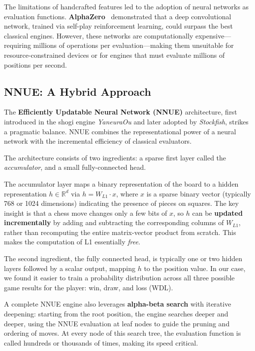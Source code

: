 The limitations of handcrafted features led to the adoption of neural networks as evaluation functions. \textbf{AlphaZero}~\cite{silver2018alphazero} demonstrated that a deep convolutional network, trained via self-play reinforcement learning, could surpass the best classical engines. However, these networks are computationally expensive---requiring millions of operations per evaluation---making them unsuitable for resource-constrained devices or for engines that must evaluate millions of positions per second.

\subsection{NNUE: A Hybrid Approach}\label{sec:nnue}

The \textbf{Efficiently Updatable Neural Network (NNUE)} architecture, first introduced in the shogi engine \emph{YaneuraOu} and later adopted by \emph{Stockfish}, strikes a pragmatic balance. NNUE combines the representational power of a neural network with the incremental efficiency of classical evaluators.

The architecture consists of two ingredients: a sparse first layer called the \emph{accumulator}, and a small fully-connected head.

The accumulator layer maps a binary representation of the board to a hidden representation \(h \in \mathbb{R}^{d}\) via \(h = W_{L1} \cdot x\), where \(x\) is a sparse binary vector (typically 768 or 1024 dimensions) indicating the presence of pieces on squares. The key insight is that a chess move changes only a few bits of \(x\), so \(h\) can be \textbf{updated incrementally} by adding and subtracting the corresponding columns of \(W_{L1}\), rather than recomputing the entire matrix-vector product from scratch. This makes the computation of L1 essentially \emph{free}.

The second ingredient, the fully connected head, is typically one or two hidden layers followed by a scalar output, mapping \(h\) to the position value. In our case, we found it easier to train a probability distribution across all three possible game results for the player: win, draw, and loss (WDL).

A complete NNUE engine also leverages \textbf{alpha-beta search} with iterative deepening: starting from the root position, the engine searches deeper and deeper, using the NNUE evaluation at leaf nodes to guide the pruning and ordering of moves. At every node of this search tree, the evaluation function is called hundreds or thousands of times, making its speed critical.

